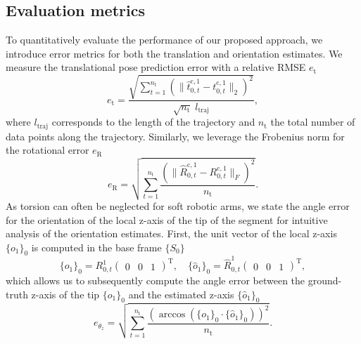 \subsection{Evaluation metrics}
To quantitatively evaluate the performance of our proposed approach, we introduce error metrics for both the translation and orientation estimates.
%
We measure the translational pose prediction error with a relative \gls{RMSE} $e_\mathrm{t}$
\begin{equation}\label{eq:srslam:evaluation_translational_error}
    e_\mathrm{t} = \frac{\sqrt{\sum_{t=1}^{n_\mathrm{t}} \left (\lVert \hat{t}_{0,t}^{\mathrm{c},1} - t_{0,t}^{\mathrm{c},1} \rVert_2 \right )^2}}{\sqrt{n_\mathrm{t}} \; l_\mathrm{traj}},
\end{equation}
where $l_\mathrm{traj}$ corresponds to the length of the trajectory and $n_\mathrm{t}$ the total number of data points along the trajectory. Similarly, we leverage the Frobenius norm for the rotational error $e_\mathrm{R}$
\begin{equation}\label{eq:srslam:evaluation_rotational_error}
    e_\mathrm{R} = \sqrt{\sum_{t=1}^{n_\mathrm{t}} \frac{\left (\big\lVert \hat{R}_{0,t}^{\mathrm{c},1} - R_{0,t}^{\mathrm{c},1} \big\rVert_F \right )^2}{n_\mathrm{t}}}.
\end{equation}
As torsion can often be neglected for soft robotic arms, we state the angle error for the orientation of the local z-axis of the tip of the segment for intuitive analysis of the orientation estimates. First, the unit vector of the local z-axis $\{ o_{1} \}_{0}$ is computed in the base frame $\{ S_0 \}$
\begin{equation}
    \{ o_1 \}_0 = R_{0,t}^{1}\begin{pmatrix}0 & 0 & 1\end{pmatrix}^\mathrm{T},
    \quad
    \{ \hat{o}_1 \}_0 = \hat{R}_{0,t}^{1}\begin{pmatrix}0 & 0 & 1\end{pmatrix}^\mathrm{T},
\end{equation}
which allows us to subsequently compute the angle error between the ground-truth z-axis of the tip $\{ o_1 \}_0$ and the estimated z-axis $ \{ \hat{o}_1 \}_0$
\begin{equation}\label{eq:srslam:evaluation_angle_error}
    e_{\theta_z} = \sqrt{\sum_{t=1}^{n_\mathrm{t}} \frac{\left (\arccos \left ( \{ o_1 \}_0 \cdot \{ \hat{o}_1 \}_0 \right ) \right )^2}{n_\mathrm{t}}}.
\end{equation}

